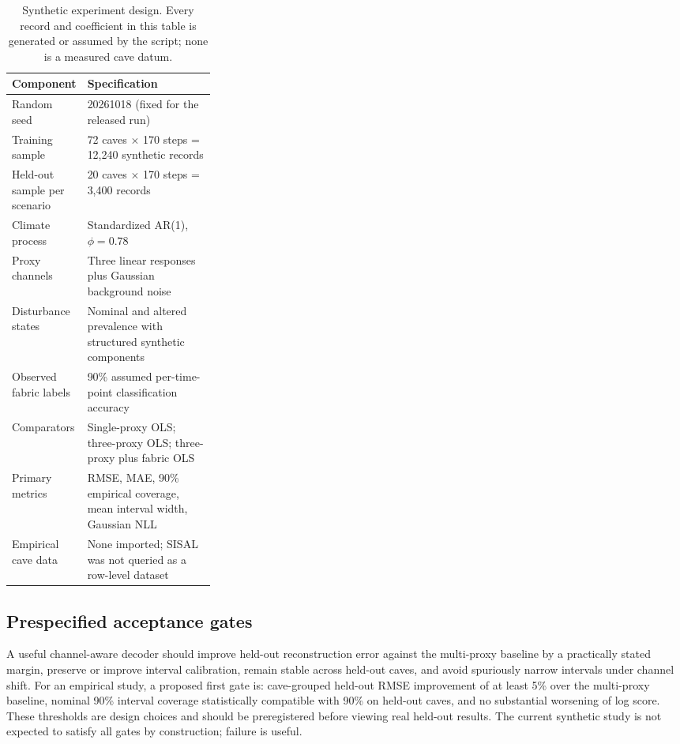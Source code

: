 \documentclass[11pt,a4paper]{article}
\begin{document}
\begin{table}[!htbp]\centering\small
\caption{Synthetic experiment design. Every record and coefficient in this table is generated or assumed by the script; none is a measured cave datum.}\label{tab:design}
\begin{tabularx}{\linewidth}{p{0.30\linewidth}X}\toprule
Component & Specification \\\midrule
Random seed & 20261018 (fixed for the released run) \\
Training sample & 72 caves $\times$ 170 steps = 12,240 synthetic records \\
Held-out sample per scenario & 20 caves $\times$ 170 steps = 3,400 records \\
Climate process & Standardized AR(1), $\phi=0.78$ \\
Proxy channels & Three linear responses plus Gaussian background noise \\
Disturbance states & Nominal and altered prevalence with structured synthetic components \\
Observed fabric labels & 90\% assumed per-time-point classification accuracy \\
Comparators & Single-proxy OLS; three-proxy OLS; three-proxy plus fabric OLS \\
Primary metrics & RMSE, MAE, 90\% empirical coverage, mean interval width, Gaussian NLL \\
Empirical cave data & None imported; SISAL was not queried as a row-level dataset \\
\bottomrule\end{tabularx}\end{table}

\subsection{Prespecified acceptance gates}
A useful channel-aware decoder should improve held-out reconstruction error against the multi-proxy baseline by a practically stated margin, preserve or improve interval calibration, remain stable across held-out caves, and avoid spuriously narrow intervals under channel shift. For an empirical study, a proposed first gate is: cave-grouped held-out RMSE improvement of at least 5\% over the multi-proxy baseline, nominal 90\% interval coverage statistically compatible with 90\% on held-out caves, and no substantial worsening of log score. These thresholds are design choices and should be preregistered before viewing real held-out results. The current synthetic study is not expected to satisfy all gates by construction; failure is useful.
\end{document}
